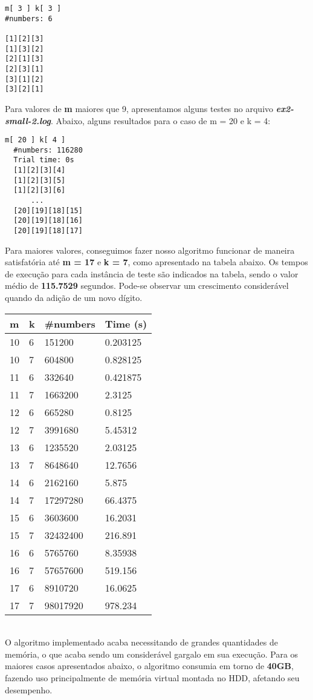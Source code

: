 \documentclass[twoside]{article}
\begin{document}
\begin{multicols}{2}
\begin{lstlisting}
m[ 3 ] k[ 3 ]
#numbers: 6

[1][2][3]
[1][3][2]
[2][1][3]
[2][3][1]
[3][1][2]
[3][2][1]
\end{lstlisting}

\indent Para valores de \textbf{m} maiores que 9, apresentamos alguns testes no arquivo \textbf{\textit{ex2-small-2.log}}. Abaixo, alguns resultados para o caso de m = 20 e k = 4:

\begin{lstlisting}
m[ 20 ] k[ 4 ]
  #numbers: 116280
  Trial time: 0s
  [1][2][3][4]
  [1][2][3][5]
  [1][2][3][6]
      ...
  [20][19][18][15]
  [20][19][18][16]
  [20][19][18][17]
\end{lstlisting}

\indent Para maiores valores, conseguimos fazer nosso algoritmo funcionar de maneira satisfatória até \textbf{m = 17} e \textbf{k = 7}, como apresentado na tabela abaixo. Os tempos de execução para cada instância de teste são indicados na tabela, sendo o valor médio de \textbf{115.7529} segundos. Pode-se observar um crescimento considerável quando da adição de um novo dígito.\\

\begin{tabular}{llll}
  \toprule
  \textbf{m}  &  \textbf{k} &   \textbf{\#numbers} &  \textbf{Time (s)} \\
  \midrule
  10 &  6 &   151200    &   0.203125  \\
  10 &  7 &   604800    &   0.828125  \\
  11 &  6 &   332640    &   0.421875  \\
  11 &  7 &   1663200   &   2.3125    \\
  12 &  6 &   665280    &   0.8125    \\
  12 &  7 &   3991680   &   5.45312   \\
  13 &  6 &   1235520   &   2.03125   \\
  13 &  7 &   8648640   &   12.7656   \\
  14 &  6 &   2162160   &   5.875     \\
  14 &  7 &   17297280  &   66.4375   \\
  15 &  6 &   3603600   &   16.2031   \\
  15 &  7 &   32432400  &   216.891   \\
  16 &  6 &   5765760   &   8.35938   \\
  16 &  7 &   57657600  &   519.156   \\
  17 &  6 &   8910720   &   16.0625   \\
  17 &  7 &   98017920  &   978.234   \\
  \bottomrule 
\end{tabular}\\
\newline\newline
\indent O algoritmo implementado acaba necessitando de grandes quantidades de memória, o que acaba sendo um considerável gargalo em sua execução. Para os maiores casos apresentados abaixo, o algoritmo consumia em torno de \textbf{40GB}, fazendo uso principalmente de memória virtual montada no HDD, afetando seu desempenho.


\end{multicols}
\end{document}
